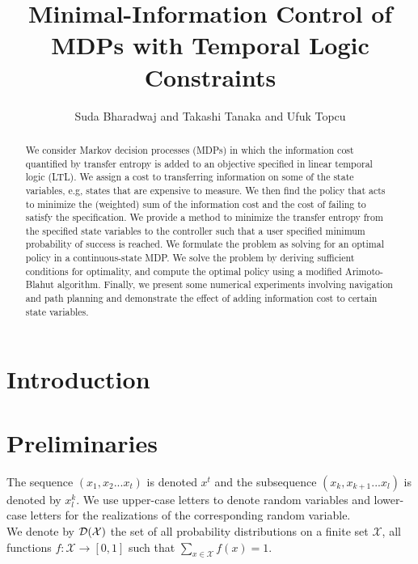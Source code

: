 \documentclass[letterpaper, 10 pt, conference]{ieeeconf}  %
\title{Minimal-Information Control of MDPs with Temporal Logic Constraints
}
\author{Suda Bharadwaj and Takashi Tanaka and Ufuk Topcu%
}
\begin{document}
\maketitle
\thispagestyle{empty}
\pagestyle{empty}


\begin{abstract}
We consider Markov decision processes (MDPs) in which the information cost quantified by transfer entropy is added to an objective specified in linear temporal logic (LTL). We assign a cost to transferring information on some of the state variables, e.g, states that are expensive to measure. We then find the policy that acts to minimize the (weighted) sum of the information cost and the cost of failing to satisfy the specification. We provide a method to minimize the transfer entropy from the specified state variables to the controller such that a user specified minimum probability of success is reached. We formulate the problem as solving for an optimal policy in a continuous-state MDP. We solve the problem by deriving sufficient conditions for optimality, and compute the optimal policy using a modified Arimoto-Blahut algorithm. Finally, we present some numerical experiments involving navigation and path planning and demonstrate the effect of adding information cost to certain state variables.
\end{abstract}


\section{Introduction}



\section{Preliminaries}
The sequence $\left(x_1,x_{2}...x_t \right)$ is denoted $x^t$ and the subsequence $\left(x_k,x_{k+1}...x_l \right)$ is denoted by $x_{l}^{k}$. We use upper-case letters to denote random variables and lower-case letters for the realizations of the corresponding random variable. \\
We denote by $\mathcal{D}(\mathcal{X})$ the set of all probability distributions on a finite
set $\mathcal{X}$, \ie all functions $f: \mathcal{X} \to [0,1]$ such that $\sum_{x\in \mathcal{X}}f(x)=1$. %
\end{document}
